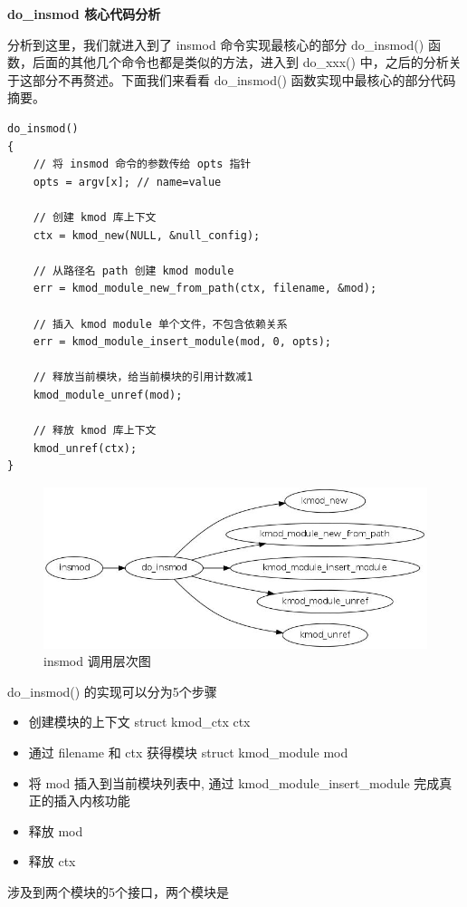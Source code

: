 \documentclass[11pt,a4paper]{article}
\makeatletter
\def\maxwidth{\ifdim\Gin@nat@width>\linewidth\linewidth
\else\Gin@nat@width\fi}
\let\Oldincludegraphics\includegraphics
\renewcommand{\includegraphics}[1]{\Oldincludegraphics[width=\maxwidth]{#1}}
\makeatother
\begin{document}
\textbf{do\_insmod 核心代码分析}

分析到这里，我们就进入到了 insmod 命令实现最核心的部分 do\_insmod()
函数，后面的其他几个命令也都是类似的方法，进入到 do\_xxx()
中，之后的分析关于这部分不再赘述。下面我们来看看 do\_insmod()
函数实现中最核心的部分代码摘要。

{\begin{shaded}\begin{verbatim}
do_insmod()
{
    // 将 insmod 命令的参数传给 opts 指针
    opts = argv[x]; // name=value

    // 创建 kmod 库上下文
    ctx = kmod_new(NULL, &null_config);

    // 从路径名 path 创建 kmod module
    err = kmod_module_new_from_path(ctx, filename, &mod);

    // 插入 kmod module 单个文件，不包含依赖关系
    err = kmod_module_insert_module(mod, 0, opts);

    // 释放当前模块，给当前模块的引用计数减1
    kmod_module_unref(mod);

    // 释放 kmod 库上下文
    kmod_unref(ctx);
}
\end{verbatim}\end{shaded}}
\begin{figure}[htbp]
\centering
\includegraphics{./figures/insmod.jpg}
\caption{insmod 调用层次图}
\end{figure}

do\_insmod() 的实现可以分为5个步骤

\begin{itemize}
\item
  创建模块的上下文 struct kmod\_ctx ctx
\item
  通过 filename 和 ctx 获得模块 struct kmod\_module mod
\item
  将 mod 插入到当前模块列表中, 通过 kmod\_module\_insert\_module
  完成真正的插入内核功能
\item
  释放 mod
\item
  释放 ctx
\end{itemize}
涉及到两个模块的5个接口，两个模块是
\end{document}
